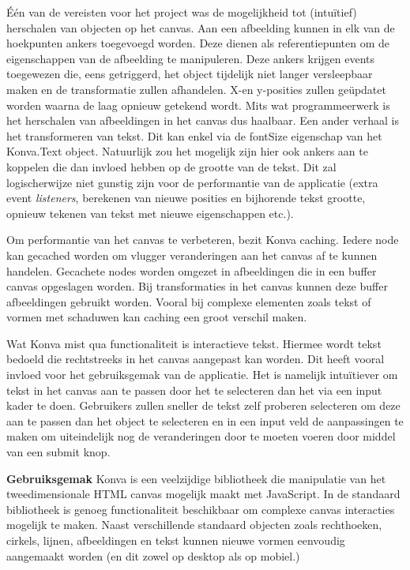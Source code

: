 \'{E}\'{e}n van de vereisten voor het project was de mogelijkheid tot (intu\"{i}tief) herschalen van objecten op het canvas. Aan een afbeelding kunnen in elk van de hoekpunten ankers toegevoegd worden. Deze dienen als referentiepunten om de eigenschappen van de afbeelding te manipuleren. Deze ankers krijgen events toegewezen die, eens getriggerd, het object tijdelijk niet langer versleepbaar maken en de transformatie zullen afhandelen. X-en y-posities zullen ge\"{u}pdatet worden waarna de laag opnieuw getekend wordt. Mits wat programmeerwerk is het herschalen van afbeeldingen in het canvas dus haalbaar. Een ander verhaal is het transformeren van tekst. Dit kan enkel via de fontSize eigenschap van het Konva.Text object. Natuurlijk zou het mogelijk zijn hier ook ankers aan te koppelen die dan invloed hebben op de grootte van de tekst. Dit zal logischerwijze niet gunstig zijn voor de performantie van de applicatie (extra event \textit{listeners}, berekenen van nieuwe posities en bijhorende tekst grootte, opnieuw tekenen van tekst met nieuwe eigenschappen etc.). %

Om performantie van het canvas te verbeteren, bezit Konva caching. Iedere node kan gecached worden om vlugger veranderingen aan het canvas af te kunnen handelen. Gecachete nodes worden omgezet in afbeeldingen die in een buffer canvas opgeslagen worden. Bij transformaties in het canvas kunnen deze buffer afbeeldingen gebruikt worden. Vooral bij complexe elementen zoals tekst of vormen met schaduwen kan caching een groot verschil maken. 

Wat Konva mist qua functionaliteit is interactieve tekst. Hiermee wordt tekst bedoeld die rechtstreeks in het canvas aangepast kan worden. Dit heeft vooral invloed voor het gebruiksgemak van de applicatie. Het is namelijk intu\"{i}tiever om tekst in het canvas aan te passen door het te selecteren dan het via een input kader te doen. Gebruikers zullen sneller de tekst zelf proberen selecteren om deze aan te passen dan het object te selecteren en in een input veld de aanpassingen te maken om uiteindelijk nog de veranderingen door te moeten voeren door middel van een submit knop. 

\textbf{Gebruiksgemak} \break
Konva is een veelzijdige bibliotheek die manipulatie van het tweedimensionale HTML canvas mogelijk maakt met JavaScript. In de standaard bibliotheek is genoeg functionaliteit beschikbaar om complexe canvas interacties mogelijk te maken. Naast verschillende standaard objecten zoals rechthoeken, cirkels, lijnen, afbeeldingen en tekst kunnen nieuwe vormen eenvoudig aangemaakt worden (en dit zowel op desktop als op mobiel.)

